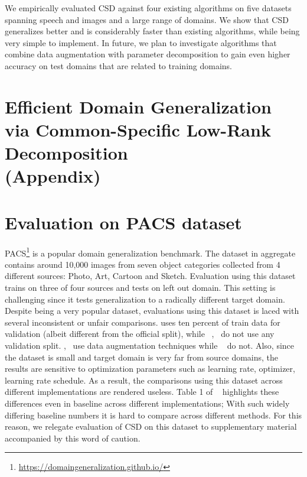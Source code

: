 \documentclass{article}
\begin{document}
We empirically evaluated CSD against four existing algorithms on five datasets spanning speech and images and a large range of domains.  We show that CSD generalizes better and is considerably faster than existing algorithms, while being very simple to implement.
In future, we plan to investigate algorithms that combine data augmentation with parameter decomposition to gain even higher accuracy on test domains that are related to training domains.






\newpage
\section*{\centering Efficient Domain Generalization via Common-Specific Low-Rank Decomposition \\ (Appendix)}
\section{Evaluation on PACS dataset}
PACS\footnote{\url{https://domaingeneralization.github.io/}} is a popular domain generalization benchmark. The dataset in aggregate contains around 10,000 images from seven object categories collected from 4 different sources: Photo, Art, Cartoon and Sketch. Evaluation using this dataset trains on three of four sources and tests on left out domain. This setting is challenging since it tests generalization to a radically different target domain. Despite being a very popular dataset, evaluations using this dataset is laced with several inconsistent or unfair comparisons. \cite{CarlucciAS2019} uses ten percent of train data for validation (albeit different from the official split), while ~\cite{DouCK19},~\cite{BalajiSR2018} do not use any validation split. \cite{CarlucciAS2019},~\cite{DouCK19} use data augmentation techniques while ~\cite{BalajiSR2018} do not. Also, since the dataset is small and target domain is very far from source domains, the results are sensitive to optimization parameters such as learning rate, optimizer, learning rate schedule. As a result, the comparisons using this dataset across different implementations are rendered useless. Table 1 of ~\cite{CarlucciAS2019} highlights these differences even in baseline across different implementations; With such widely differing baseline numbers it is hard to compare across different methods. For this reason, we relegate evaluation of CSD on this dataset to supplementary material accompanied by this word of caution.
\end{document}
